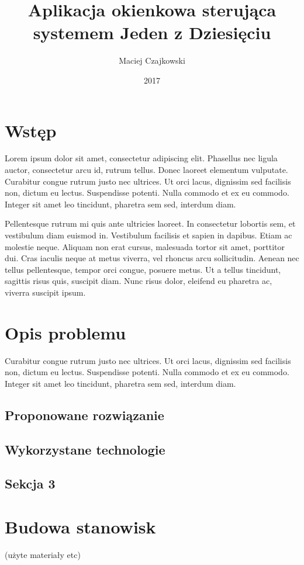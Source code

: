 \documentclass[wmii,inf,mgr]{uwmthesis}
\date{2017}
\title{Aplikacja okienkowa sterująca systemem Jeden z Dziesięciu}
\author{Maciej Czajkowski}
\begin{document}
	
\maketitle
	
\tableofcontents

\chapter*{Wstęp}
Lorem ipsum dolor sit amet, consectetur adipiscing elit. Phasellus nec ligula auctor, consectetur arcu id, rutrum tellus. Donec laoreet elementum vulputate. Curabitur congue rutrum justo nec ultrices. Ut orci lacus, dignissim sed facilisis non, dictum eu lectus. Suspendisse potenti. Nulla commodo et ex eu commodo. Integer sit amet leo tincidunt, pharetra sem sed, interdum diam. 

Pellentesque rutrum mi quis ante ultricies laoreet. In consectetur lobortis sem, et vestibulum diam euismod in. Vestibulum facilisis et sapien in dapibus. Etiam ac molestie neque. Aliquam non erat cursus, malesuada tortor sit amet, porttitor dui. Cras iaculis neque at metus viverra, vel rhoncus arcu sollicitudin. Aenean nec tellus pellentesque, tempor orci congue, posuere metus. Ut a tellus tincidunt, sagittis risus quis, suscipit diam. Nunc risus dolor, eleifend eu pharetra ac, viverra suscipit ipsum.

\chapter{Opis problemu}
Curabitur congue rutrum justo nec ultrices. Ut orci lacus, dignissim sed facilisis non, dictum eu lectus. Suspendisse potenti. Nulla commodo et ex eu commodo. Integer sit amet leo tincidunt, pharetra sem sed, interdum diam.
\section{Proponowane rozwiązanie}
\section{Wykorzystane technologie}
\section{Sekcja 3}

\chapter{Budowa stanowisk}
(użyte materiały etc)
\end{document}

